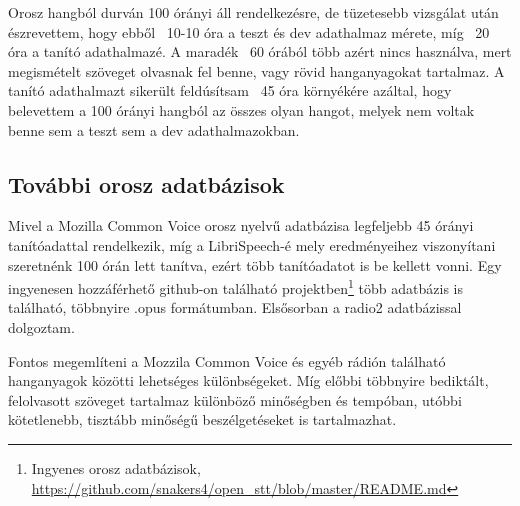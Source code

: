Orosz hangból durván 100 órányi áll rendelkezésre, de tüzetesebb vizsgálat után észrevettem, hogy ebből ~10-10 óra a teszt és dev adathalmaz mérete, míg ~20 óra a tanító adathalmazé. A maradék ~60 órából több azért nincs használva, mert megismételt szöveget olvasnak fel benne, vagy rövid hanganyagokat tartalmaz. A tanító adathalmazt sikerült feldúsítsam ~45 óra környékére azáltal, hogy belevettem a 100 órányi hangból az összes olyan hangot, melyek nem voltak benne sem a teszt sem a dev adathalmazokban.


\subsection{További orosz adatbázisok}

Mivel a Mozilla Common Voice orosz nyelvű adatbázisa legfeljebb 45 órányi tanítóadattal rendelkezik, míg a LibriSpeech-é mely eredményeihez viszonyítani szeretnénk 100 órán lett tanítva, ezért több tanítóadatot is be kellett vonni. Egy ingyenesen hozzáférhető github-on található projektben\footnote{Ingyenes orosz adatbázisok, \url{https://github.com/snakers4/open_stt/blob/master/README.md}} több adatbázis is található, többnyire .opus formátumban. Elsősorban a radio2 adatbázissal dolgoztam.

Fontos megemlíteni a Mozzila Common Voice és egyéb rádión található hanganyagok közötti lehetséges különbségeket. Míg előbbi többnyire bediktált, felolvasott szöveget tartalmaz különböző minőségben és tempóban, utóbbi kötetlenebb, tisztább minőségű beszélgetéseket is tartalmazhat.

